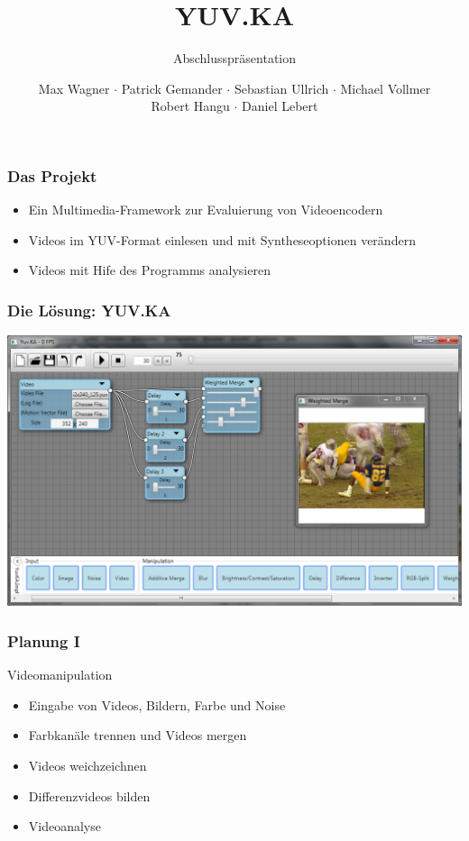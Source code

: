 \documentclass[t]{beamer}
\title{YUV.KA}
\subtitle{Abschlusspräsentation}
\author{Max Wagner $\cdot$ Patrick Gemander $\cdot$ Sebastian Ullrich $\cdot$ Michael Vollmer \\ Robert Hangu $\cdot$ Daniel Lebert}
\institute[ITEC]{Institut für Technische Informatik}
\begin{document}
\begin{frame}
	\maketitle
\end{frame}

\begin{frame}
	\frametitle{Das Projekt}
	
	\begin{itemize}
		\item<+-> Ein Multimedia-Framework zur Evaluierung von Videoencodern
		\item<+-> Videos im YUV-Format einlesen und mit Syntheseoptionen verändern
		\item<+-> Videos mit Hife des Programms analysieren
	\end{itemize}
\end{frame}

\begin{frame}
	\frametitle{Die Lösung: YUV.KA}
	\begin{center}
		\includegraphics[height=0.7\textheight]{startup_screenshot.png}
	\end{center}
\end{frame}

\begin{frame}
	\frametitle{Planung I}
	Videomanipulation ~\\
	\begin{itemize}
		\item<+-> Eingabe von Videos, Bildern, Farbe und Noise
		\item<+-> Farbkanäle trennen und Videos mergen
		\item<+-> Videos weichzeichnen
		\item<+-> Differenzvideos bilden
		\item<+-> Videoanalyse
	\end{itemize}
\end{frame}
\end{document}

